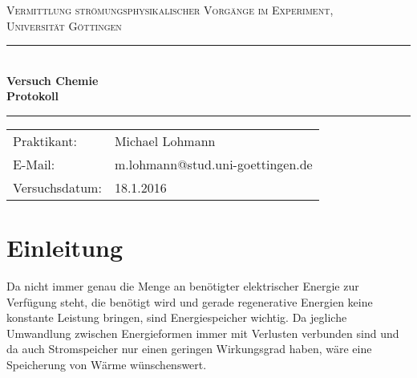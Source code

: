 \documentclass[12pt,a4paper,titlepage,headinclude,bibtotoc]{scrartcl}
\begin{document}
\begin{titlepage}
\centering
\textsc{\Large Vermittlung strömungsphysikalischer Vorgänge im Experiment,
\\[1.5ex] Universität Göttingen}

\vspace*{3cm}

\rule{\textwidth}{1pt}\\[0.5cm]
{\huge \bfseries
  Versuch Chemie  \\[1.5ex]
  Protokoll}\\[0.5cm]
\rule{\textwidth}{1pt}

\vspace*{3cm}

\begin{Large}
\begin{tabular}{ll}
Praktikant: &  Michael Lohmann\\
 E-Mail: & m.lohmann@stud.uni-goettingen.de\\
 Versuchsdatum: & 18.1.2016\\
\end{tabular}
\end{Large}

\vspace*{0.8cm}

\begin{Large}
\end{Large}

\end{titlepage}
\newpage


\section{Einleitung}
Da nicht immer genau die Menge an benötigter elektrischer Energie zur Verfügung steht, die benötigt wird und gerade regenerative Energien keine konstante Leistung bringen, sind Energiespeicher wichtig.
Da jegliche Umwandlung zwischen Energieformen immer mit Verlusten verbunden sind und da auch Stromspeicher nur einen geringen Wirkungsgrad haben, wäre eine Speicherung von Wärme wünschenswert.
\end{document}
